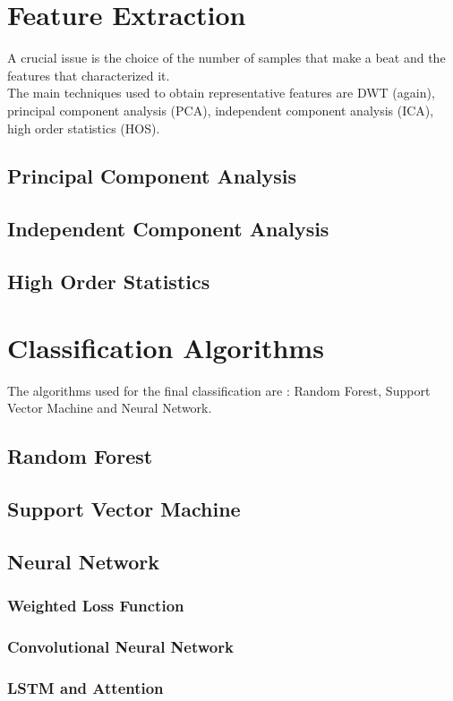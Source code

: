 \documentclass[LaM,binding=0.6cm]{sapthesis}
\begin{document}
\chapter{Feature Extraction}
A crucial issue is the choice of the number of samples that make a beat and the features that characterized it.\\The main techniques used to obtain representative features are DWT (again), principal component analysis (PCA), independent component analysis (ICA), high order statistics (HOS).
\section{Principal Component Analysis }
\section{Independent Component Analysis }
\section{High Order Statistics }

\chapter{Classification Algorithms}
The algorithms used for the final classification are : Random Forest, Support Vector Machine and Neural Network.
\section{Random Forest}
\section{Support Vector Machine}
\section{Neural Network}
\subsection{Weighted Loss Function}\label{wls}
\subsection{Convolutional Neural Network}
\subsection{LSTM and Attention}
\end{document}
